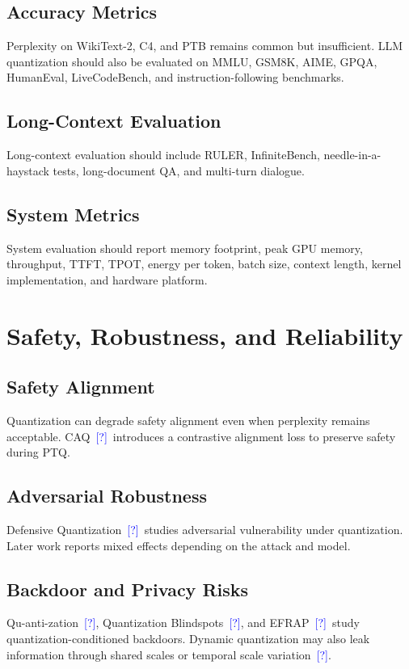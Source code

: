 \documentclass[journal,10pt]{IEEEtran}
\newcommand{\CITE}{\textcolor{blue}{[?]}}
\begin{document}
\subsection{Accuracy Metrics}
Perplexity on WikiText-2, C4, and PTB remains common but insufficient. LLM quantization should also be evaluated on MMLU, GSM8K, AIME, GPQA, HumanEval, LiveCodeBench, and instruction-following benchmarks.

\subsection{Long-Context Evaluation}
Long-context evaluation should include RULER, InfiniteBench, needle-in-a-haystack tests, long-document QA, and multi-turn dialogue.

\subsection{System Metrics}
System evaluation should report memory footprint, peak GPU memory, throughput, TTFT, TPOT, energy per token, batch size, context length, kernel implementation, and hardware platform.

\section{Safety, Robustness, and Reliability}

\subsection{Safety Alignment}
Quantization can degrade safety alignment even when perplexity remains acceptable. CAQ~\CITE\ introduces a contrastive alignment loss to preserve safety during PTQ.

\subsection{Adversarial Robustness}
Defensive Quantization~\CITE\ studies adversarial vulnerability under quantization. Later work reports mixed effects depending on the attack and model.

\subsection{Backdoor and Privacy Risks}
Qu-anti-zation~\CITE, Quantization Blindspots~\CITE, and EFRAP~\CITE\ study quantization-conditioned backdoors. Dynamic quantization may also leak information through shared scales or temporal scale variation~\CITE.
\end{document}
